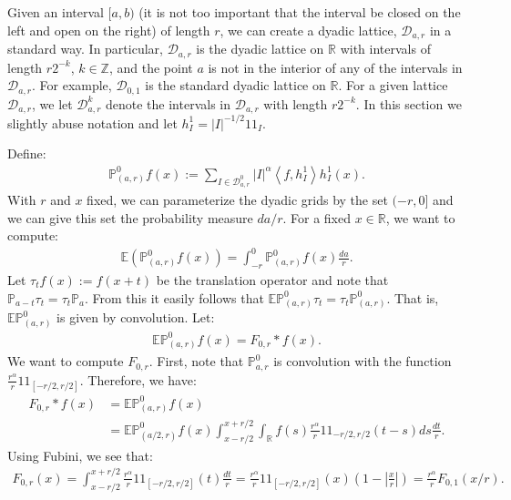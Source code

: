 \documentclass[12pt]{amsart}
\begin{document}
Given an interval $[a,b)$ (it is not too important that the 
interval be closed on the left and open on the right) of
length $r$, we can create a dyadic lattice, ${\mathcal{{D}}}_{a,r}$
in a standard way. In particular, ${\mathcal{{D}}}_{a,r}$ is the
dyadic lattice on $\mathbb{R}$ with intervals of length
$r2^{-k}$, $k\in\mathbb{Z}$, and the point $a$ is not in
the interior of any of the intervals in ${\mathcal{{D}}}_{a,r}$.
For example, ${\mathcal{{D}}}_{0,1}$ is the standard dyadic lattice
on $\mathbb{R}$. For a given lattice ${\mathcal{{D}}}_{a,r}$, we
let ${\mathcal{{D}}}_{a,r}^{k}$ denote the intervals in 
${\mathcal{{D}}}_{a,r}$ with length $r2^{-k}$. In this section we 
slightly abuse notation and let $h_{I}^{1}={\ensuremath{\left\vert{I}\right\vert}}^{-1/2}{1\!\!1}_{I}$. 

Define:
\begin{align*}
\mathbb{P}_{(a,r)}^{0}f(x)
:=\sum_{I\in{\mathcal{{D}}}_{a,r}^{0}}{\ensuremath{\left\vert{I}\right\vert}}^{\alpha}{\ensuremath{\left\langle{f},{{h_{{I}}^{1}}}\right\rangle}}{h_{{I}}^{1}}(x).
\end{align*}
With $r$ and $x$ fixed, we can parameterize the dyadic
grids by the set $(-r,0]$ and we can give this set 
the probability measure $da/r$. 
For a fixed $x\in\mathbb{R}$, 
we want to compute:
\begin{align*}
\mathbb{E}(\mathbb{P}_{(a,r)}^{0}f(x))
=\int_{-r}^{0}\mathbb{P}_{(a,r)}^{0}f(x)\frac{da}{r}.
\end{align*}
Let $\tau_{t}f(x):=f(x+t)$ be the translation
operator and note that $\mathbb{P}_{a-t}\tau_t
=\tau_t\mathbb{P}_a$. From this it easily follows
that $\mathbb{E}\mathbb{P}_{(a,r)}^{0}\tau_t
=\tau_t\mathbb{P}_{(a,r)}^{0}$. That is, 
$\mathbb{E}\mathbb{P}_{(a,r)}^{0}$ is given
by convolution. Let:
\begin{align*}
\mathbb{E}\mathbb{P}_{(a,r)}^{0}f(x)=F_{0,r}\ast f(x).
\end{align*}
We want to compute $F_{0,r}$. First, note that 
$\mathbb{P}_{a,r}^{0}$ is convolution with the function
$\frac{r^{\alpha}}{r}{1\!\!1}_{[-r/2,r/2]}$. Therefore, we have:
\begin{align*}
F_{0,r}\ast f(x)
&=\mathbb{E}\mathbb{P}_{(a,r)}^{0}f(x)
\\&=\mathbb{E}\mathbb{P}_{(a/2,r)}^{0}f(x)
\int_{x-r/2}^{x+r/2}\int_{\mathbb{R}}
  f(s)\frac{r^\alpha}{r}{1\!\!1}_{-r/2,r/2}(t-s)ds\frac{dt}{r}.
\end{align*}
Using Fubini, we see that:
\begin{align*}
F_{0,r}(x)
=\int_{x-r/2}^{x+r/2}\frac{r^\alpha}{r}{1\!\!1}_{[-r/2,r/2]}(t)\frac{dt}{r}
=\frac{r^\alpha}{r}{1\!\!1}_{[-r/2,r/2]}(x)\left(1-{\ensuremath{\left\vert{\frac{x}{r}}\right\vert}}\right)
=\frac{r^\alpha}{r}F_{0,1}(x/r).
\end{align*}
\end{document}
